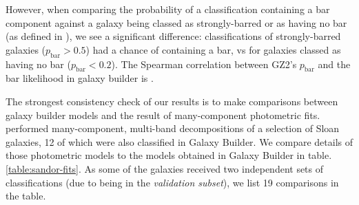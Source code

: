 \documentclass[../main.tex]{subfiles}
\begin{document}
However, when comparing the probability of a classification containing a bar component against a galaxy being classed as strongly-barred or as having no bar (as defined in \citealt{Masters2010:1003.0449v2}), we see a significant difference: classifications of strongly-barred galaxies ($p_\text{bar} > 0.5$) had a  chance of containing a bar, vs  for galaxies classed as having no bar ($p_\text{bar} < 0.2$). The Spearman correlation between GZ2's $p_\text{bar}$ and the bar likelihood in galaxy builder is .

The strongest consistency check of our results is to make comparisons between galaxy builder models and the result of many-component photometric fits. \citet{Kruk2017:1710.00093v2} performed many-component, multi-band decompositions of a selection of Sloan galaxies, 12 of which were also classified in Galaxy Builder. We compare details of those photometric models to the models obtained in Galaxy Builder in table.\ref{table:sandor-fits}. As some of the galaxies received two independent sets of classifications (due to being in the \textit{validation subset}), we list 19 comparisons in the table.

\end{document}
